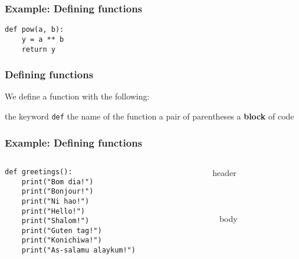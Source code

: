 \documentclass[11pt]{beamer}
\begin{document}
\begin{frame}[fragile]
  \frametitle{Example:  Defining functions}
  \Enlarge

  \begin{Verbatim}[commandchars=\\\{\},commentchar=\%]
def pow(a, b):
    y = a ** b
    return y
  \end{Verbatim}
\end{frame}

\begin{frame}[fragile]
  \frametitle{Defining functions}
  \Enlarge

  \begin{itemize}
  \myitem  We define a function with the following:
    \begin{itemize}
    \mysubitem  the keyword \texttt{def}
    \mysubitem  the name of the function
    \mysubitem  a pair of parentheses
    \mysubitem  a \textbf{block} of code
    \end{itemize}
  \end{itemize}
\end{frame}

\begin{frame}[fragile]
  \frametitle{Example:  Defining functions}
  \Enlarge

  \begin{columns}
  \begin{column}{0.75\textwidth}
\begin{Verbatim}[commandchars=\\\{\},commentchar=\%]
def greetings():
    print("Bom dia!")
    print("Bonjour!")
    print("Ni hao!")
    print("Hello!")
    print("Shalom!")
    print("Guten tag!")
    print("Konichiwa!")
    print("As-salamu alaykum!")
\end{Verbatim}
  \end{column}
  \begin{column}{0.25\textwidth}
    header \\ ~ \\ ~ \\ ~ \\ ~ body \\ ~ \\ ~ \\ ~ \\ ~ \\
  \end{column}
  \end{columns}
\end{frame}
\end{document}

